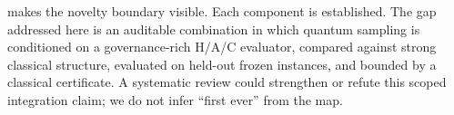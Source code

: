

 makes the novelty boundary visible. Each component is established. The gap addressed here is an auditable combination in which quantum sampling is conditioned on a governance-rich H/A/C evaluator, compared against strong classical structure, evaluated on held-out frozen instances, and bounded by a classical certificate. A systematic review could strengthen or refute this scoped integration claim; we do not infer ``first ever'' from the map.
